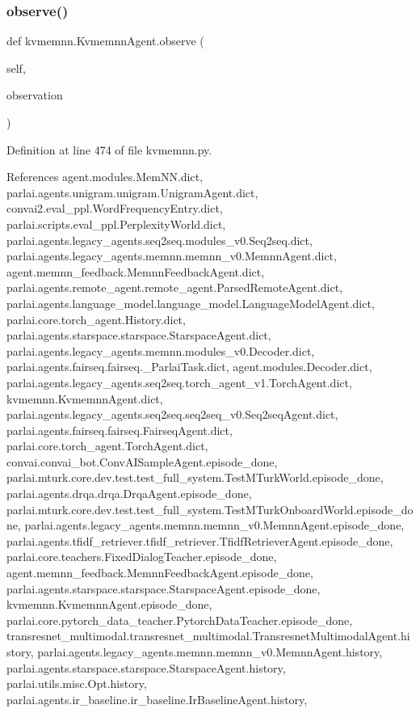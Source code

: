 \subsubsection{\texorpdfstring{observe()}{observe()}}
{\footnotesize\ttfamily def kvmemnn.\+Kvmemnn\+Agent.\+observe (\begin{DoxyParamCaption}\item[{}]{self,  }\item[{}]{observation }\end{DoxyParamCaption})}



Definition at line 474 of file kvmemnn.\+py.



References agent.\+modules.\+Mem\+N\+N.\+dict, parlai.\+agents.\+unigram.\+unigram.\+Unigram\+Agent.\+dict, convai2.\+eval\+\_\+ppl.\+Word\+Frequency\+Entry.\+dict, parlai.\+scripts.\+eval\+\_\+ppl.\+Perplexity\+World.\+dict, parlai.\+agents.\+legacy\+\_\+agents.\+seq2seq.\+modules\+\_\+v0.\+Seq2seq.\+dict, parlai.\+agents.\+legacy\+\_\+agents.\+memnn.\+memnn\+\_\+v0.\+Memnn\+Agent.\+dict, agent.\+memnn\+\_\+feedback.\+Memnn\+Feedback\+Agent.\+dict, parlai.\+agents.\+remote\+\_\+agent.\+remote\+\_\+agent.\+Parsed\+Remote\+Agent.\+dict, parlai.\+agents.\+language\+\_\+model.\+language\+\_\+model.\+Language\+Model\+Agent.\+dict, parlai.\+core.\+torch\+\_\+agent.\+History.\+dict, parlai.\+agents.\+starspace.\+starspace.\+Starspace\+Agent.\+dict, parlai.\+agents.\+legacy\+\_\+agents.\+memnn.\+modules\+\_\+v0.\+Decoder.\+dict, parlai.\+agents.\+fairseq.\+fairseq.\+\_\+\+Parlai\+Task.\+dict, agent.\+modules.\+Decoder.\+dict, parlai.\+agents.\+legacy\+\_\+agents.\+seq2seq.\+torch\+\_\+agent\+\_\+v1.\+Torch\+Agent.\+dict, kvmemnn.\+Kvmemnn\+Agent.\+dict, parlai.\+agents.\+legacy\+\_\+agents.\+seq2seq.\+seq2seq\+\_\+v0.\+Seq2seq\+Agent.\+dict, parlai.\+agents.\+fairseq.\+fairseq.\+Fairseq\+Agent.\+dict, parlai.\+core.\+torch\+\_\+agent.\+Torch\+Agent.\+dict, convai.\+convai\+\_\+bot.\+Conv\+A\+I\+Sample\+Agent.\+episode\+\_\+done, parlai.\+mturk.\+core.\+dev.\+test.\+test\+\_\+full\+\_\+system.\+Test\+M\+Turk\+World.\+episode\+\_\+done, parlai.\+agents.\+drqa.\+drqa.\+Drqa\+Agent.\+episode\+\_\+done, parlai.\+mturk.\+core.\+dev.\+test.\+test\+\_\+full\+\_\+system.\+Test\+M\+Turk\+Onboard\+World.\+episode\+\_\+done, parlai.\+agents.\+legacy\+\_\+agents.\+memnn.\+memnn\+\_\+v0.\+Memnn\+Agent.\+episode\+\_\+done, parlai.\+agents.\+tfidf\+\_\+retriever.\+tfidf\+\_\+retriever.\+Tfidf\+Retriever\+Agent.\+episode\+\_\+done, parlai.\+core.\+teachers.\+Fixed\+Dialog\+Teacher.\+episode\+\_\+done, agent.\+memnn\+\_\+feedback.\+Memnn\+Feedback\+Agent.\+episode\+\_\+done, parlai.\+agents.\+starspace.\+starspace.\+Starspace\+Agent.\+episode\+\_\+done, kvmemnn.\+Kvmemnn\+Agent.\+episode\+\_\+done, parlai.\+core.\+pytorch\+\_\+data\+\_\+teacher.\+Pytorch\+Data\+Teacher.\+episode\+\_\+done, transresnet\+\_\+multimodal.\+transresnet\+\_\+multimodal.\+Transresnet\+Multimodal\+Agent.\+history, parlai.\+agents.\+legacy\+\_\+agents.\+memnn.\+memnn\+\_\+v0.\+Memnn\+Agent.\+history, parlai.\+agents.\+starspace.\+starspace.\+Starspace\+Agent.\+history, parlai.\+utils.\+misc.\+Opt.\+history, parlai.\+agents.\+ir\+\_\+baseline.\+ir\+\_\+baseline.\+Ir\+Baseline\+Agent.\+history, 